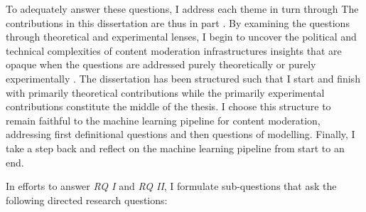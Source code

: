 To adequately answer these questions, I address each theme in turn through 
The contributions in this dissertation are thus in part .
By examining the questions through theoretical and experimental lenses, I  begin to uncover the political and technical complexities of content moderation infrastructures
 insights that are opaque when the questions are addressed purely theoretically or purely experimentally .
The dissertation has been structured such that I start and finish with primarily theoretical contributions while the primarily experimental contributions constitute the middle of the thesis.
I choose this structure to remain faithful to the machine learning pipeline for content moderation, addressing first definitional questions and then questions of modelling.
Finally, I take a step back and reflect on the machine learning pipeline from start to an end.

In efforts to answer \textit{RQ I} and \textit{RQ II}, I formulate sub-questions that ask the following directed research questions:

